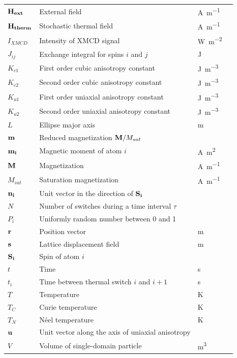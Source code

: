\documentclass[11pt,a4paper,english]{article}
\begin{document}
\begin{longtable}{llll}
$\vb{H_{ext}}$ & External field & \si{\ampere\per\metre} \\
$\vb{H_{therm}}$ & Stochastic thermal field & \si{\ampere\per\metre} \\
$I_{XMCD}$ & Intensity of XMCD signal & \si{\watt\per\metre\squared} \\
$J_{ij}$ & Exchange integral for spins $i$ and $j$ & \si{\joule} \\
$K_{c1}$ & First order cubic anisotropy constant & \si{\joule\per\metre\cubed} \\
$K_{c2}$ & Second order cubic anisotropy constant & \si{\joule\per\metre\cubed} \\
$K_{u1}$ & First order uniaxial anisotropy constant & \si{\joule\per\metre\cubed} \\
$K_{u2}$ & Second order uniaxial anisotropy constant & \si{\joule\per\metre\cubed} \\
$L$ & Ellipse major axis & \si{\metre} \\
$\vb{m}$ & Reduced magnetization $\vb{M}/M_{sat}$ &  \\
$\vb{m_i}$ & Magnetic moment of atom $i$ & \si{\ampere\metre\squared} \\
$\vb{M}$ & Magnetization & \si{\ampere\per\metre} \\
$M_{sat}$ & Saturation magnetization & \si{\ampere\per\metre} \\
$\vb{n_i}$ & Unit vector in the direction of $\vb{S_i}$ &  \\
$N$ & Number of switches during a time interval $\tau$ &  \\
$P_i$ & Uniformly random number between 0 and 1 &  \\
$\vb{r}$ & Position vector & \si{\metre} \\
$\vb{s}$ & Lattice displacement field & \si{\metre} \\
$\vb{S_i}$ & Spin of atom $i$ &  \\
$t$ & Time & \si{\second} \\
$t_i$ & Time between thermal switch $i$ and $i+1$ & \si{\second} \\
$T$ & Temperature & \si{\kelvin} \\
$T_C$ & Curie temperature & \si{\kelvin} \\
$T_N$ & N\'{e}el temperature & \si{\kelvin} \\
$\vb{u}$ & Unit vector along the axis of uniaxial anisotropy &  \\
$V$ & Volume of single-domain particle & \si{\metre\cubed} \\

\end{longtable}
\end{document}
